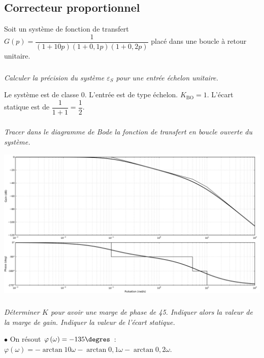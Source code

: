 \documentclass[10pt,fleqn]{article} %
\begin{document}
\def\pathfig{images}

\vspace{6cm}
\pagestyle{fancy}
\thispagestyle{plain}

\def\columnseprulecolor{\color{ocre}}
\setlength{\columnseprule}{0.4pt} 

\def\pathfig{images}

\begin{multicols}{2}

\subsection*{Correcteur proportionnel}
Soit un système de fonction de transfert $G(p)=\dfrac{1}{\left(1+10p\right)\left(1+0,1p\right)\left(1+0,2p\right)}$ placé dans une boucle à retour unitaire.

\subparagraph{}\textit{Calculer la précision du système $\varepsilon_S$ pour une entrée échelon unitaire.}

\begin{corrige}
Le système est de classe 0. L'entrée est de type échelon. $K_{\text{BO}}=1$.
L'écart statique est de $\dfrac{1}{1+1}=\dfrac{1}{2}$.
\end{corrige}

\subparagraph{}\textit{Tracer dans  le diagramme de Bode la fonction de transfert en boucle ouverte du système.}

\begin{corrige}
\begin{center}
\includegraphics[width=.9\linewidth]{images/01_Bode}
\end{center}
\end{corrige}

\subparagraph{}\textit{Déterminer $K$ pour avoir une marge de phase de 45\degres. Indiquer alors la valeur de la marge de gain. Indiquer la valeur de l'écart statique.}
\begin{corrige}
$\bullet$ On résout $\varphi\left(\omega\right)=-135\degres$ : 
$\varphi\left(\omega\right)=-\arctan 10\omega-\arctan 0,1\omega-\arctan 0,2\omega$.


\end{corrige}
\end{multicols}
\end{document}
